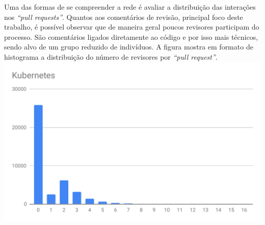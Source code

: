 \documentclass[12pt,openany,oneside,a4paper,english,brazil]{abntbibufjf}
\begin{document}
  Uma das formas de se compreender a rede é avaliar a distribuição das interações nos \textit{``pull requests''}. Quantos aos comentários de revisão, principal foco deste trabalho, é possível observar que de maneira geral poucos revisores participam do processo. São comentários ligados diretamente ao código e por isso mais técnicos, sendo alvo de um grupo reduzido de indivíduos. A figura mostra em formato de histograma a distribuição do número de revisores por \textit{``pull request''}.
  \includegraphics[width=\textwidth]{resultados/dist-rc-kubernetes}
\end{document}
